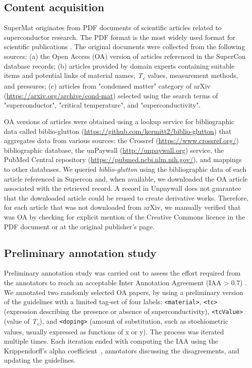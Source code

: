 \documentclass[fleqn,10pt]{wlscirep}
\begin{document}
\subsection*{Content acquisition}
SuperMat originates from PDF documents of scientific articles related to superconductor research. 
The PDF format is the most widely used format for scientific publications \cite{johnson2018pdfStatistics}.
The original documents were collected from the following sources: (a) the Open Access (OA) version of articles referenced in the SuperCon database records; 
(b) articles provided by domain experts containing suitable items and potential links of material names, \textit{T\textsubscript{c}} values, measurement methods, and pressures; (c) articles from "condensed matter" category of arXiv (\url{https://arxiv.org/archive/cond-mat}) selected using the search terms of "superconductor", "critical temperature", and "superconductivity". 

OA versions of articles were obtained using a lookup service for bibliographic data called biblio-glutton (\url{https://github.com/kermitt2/biblio-glutton}) that aggregates data from various sources: the Crossref (\url{https://www.crossref.org/}) bibliographic database, the unPaywall (\url{http://unpaywall.org}) service, the PubMed Central repository (\url{https://pubmed.ncbi.nlm.nih.gov/}), and mappings to other databases. 
We queried \textit{biblio-glutton} using the bibliographic data of each article referenced in Supercon and, when available, we downloaded the OA article associated with the retrieved record. 
A record in Unpaywall does not guarantee that the downloaded article could be reused to create derivative works. Therefore, for each article that was not downloaded from arXiv, we manually verified that was OA by checking for explicit mention of the Creative Commons licence in the PDF document or at the original publisher's page. 

\subsection*{Preliminary annotation study}
\label{subsec:preliminary-annotation-study}
Preliminary annotation study was carried out to assess the effort required from the annotators to reach an acceptable Inter Annotation Agreement (IAA > 0.7) .
We annotated two randomly selected OA papers, by using a preliminary version of the guidelines with a limited tag-set of four labels: \texttt{<material>}, \texttt{<tc>} (expression describing the presence or absence of superconductivity), \texttt{<tcValue>} (value of \textit{T\textsubscript{c}}), and \texttt{<doping>} (amount of substitution, such as stochiometric values, usually expressed as functions of x or y).
The process was iterated multiple times.
Each iteration ended with computing the IAA using the Krippendorff's alpha coefficient~\cite{Krippendorff2004ReliabilityIC,Zapf2016MeasuringIR}, annotators discussing the disagreements, and updating the guidelines.
\end{document}
